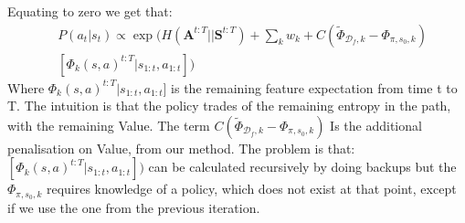 \documentclass[letterpaper]{article}
\DeclareMathOperator*{\argmax}{\arg\!\max}
\newcommand{\sw}[1]{\textcolor{red}{SW: #1}}
\newcommand{\sw}[1]{}
\begin{document}
Equating to zero we get that:
\begin{equation}
	\begin{split}
	&P(a_t|s_t) \propto \exp\Big(H(\mathbf{A}^{t:T}||\mathbf{S}^{t:T})+\sum_k w_k + C(\widetilde{\Phi}_{\mathcal{D}_f,k}-\Phi_{\pi,s_0,k})\\
	 &[\Phi_k(s,a)^{t:T}|s_{1:t},a_{1:t}]\Big)
	\end{split}
\end{equation}
Where $\Phi_k(s,a)^{t:T}|s_{1:t},a_{1:t}]$ is the remaining feature expectation from time t to T.
The intuition is that the policy trades of the remaining entropy in the path, with the remaining Value. The term $C(\widetilde{\Phi}_{\mathcal{D}_f,k}-\Phi_{\pi,s_0,k})$ Is the additional penalisation on Value, from our method. The problem is that: $[\Phi_k(s,a)^{t:T}|s_{1:t},a_{1:t}])$ can be calculated recursively by doing backups but the $\Phi_{\pi,s_0,k}$ requires knowledge of a policy, which does not exist at that point, except if we use the one from the previous iteration.
	



\end{document}
